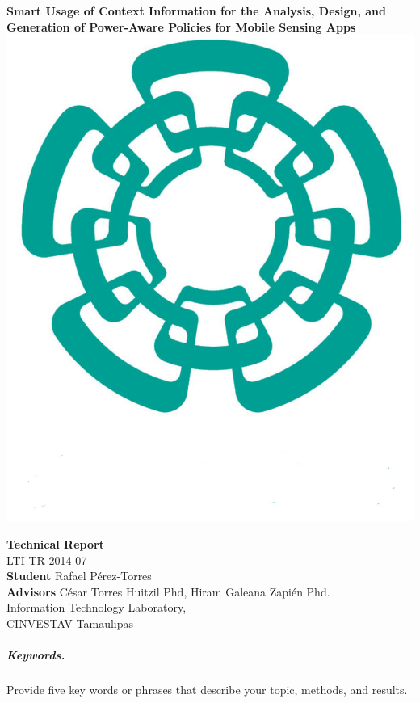 \documentclass[12pt]{article}
\numberwithin{equation}{section}
\numberwithin{table}{section}
\numberwithin{figure}{section}
\begin{document}

\begin{center}
\textbf{\Large Smart Usage of Context Information for the Analysis, Design, and Generation of Power-Aware Policies for Mobile Sensing Apps} \\[16pt]

\includegraphics[scale=0.08]{images/cinvestav2.jpg}

\textbf{Technical Report}\\[6pt]
LTI-TR-2014-07 \\[16pt]

\textbf{Student} Rafael Pérez-Torres \\[6pt]
\textbf{Advisors} César Torres Huitzil Phd, Hiram Galeana Zapién Phd.\\[16pt]

Information Technology Laboratory,\\
CINVESTAV Tamaulipas \\[16pt]

\end{center}



\subparagraph{Keywords.} Provide five key words or phrases that
describe your topic, methods, and results.









\end{document}

